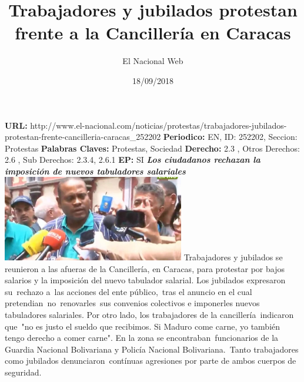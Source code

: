 \documentclass{article}%
\title{\textbf{Trabajadores y jubilados protestan frente a la Cancillería en Caracas}}%
\author{El Nacional Web}%
\date{18/09/2018}%
\begin{document}
%
\normalsize%
\maketitle%
\textbf{URL: }%
http://www.el{-}nacional.com/noticias/protestas/trabajadores{-}jubilados{-}protestan{-}frente{-}cancilleria{-}caracas\_252202\newline%
%
\textbf{Periodico: }%
EN, %
ID: %
252202, %
Seccion: %
Protestas\newline%
%
\textbf{Palabras Claves: }%
Protestas, Sociedad\newline%
%
\textbf{Derecho: }%
2.3%
, Otros Derechos: %
2.6%
, Sub Derechos: %
2.3.4, 2.6.1%
\newline%
%
\textbf{EP: }%
SI\newline%
\newline%
%
\textbf{\textit{Los ciudadanos rechazan la imposición de nuevos tabuladores salariales}}%
\newline%
\newline%
%
\includegraphics[width=300px]{264.jpg}%
\newline%
%
Trabajadores y jubilados se reunieron a las afueras de la Cancillería, en Caracas, para protestar por bajos salarios y la imposición del nuevo tabulador salarial.%
\newline%
%
Los jubilados expresaron su~rechazo a~las acciones del ente público,~tras el anuncio en el cual pretendian~no~renovarles~sus convenios colectivos e imponerles nuevos tabuladores salariales.%
\newline%
%
Por otro lado, los trabajadores de la cancillería~indicaron que~"no es justo el sueldo que recibimos. Si Maduro come carne, yo también tengo derecho a comer carne".%
\newline%
%
En la zona se encontraban~funcionarios de la Guardia Nacional Bolivariana y Policía Nacional Bolivariana.~Tanto trabajadores como jubilados denunciaron~contínuas agresiones por parte de ambos cuerpos de seguridad.%
\newline%
%
\end{document}
